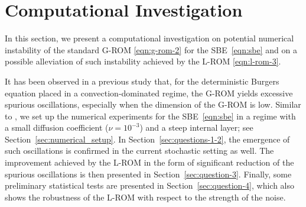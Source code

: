 \documentclass[11pt]{amsart}
\numberwithin{equation}{section}
\newcommand{\red}[1]{{\color{red}#1}}
\newcommand{\blue}[1]{{\color{blue}#1}}
\newcommand{\oa}{\overline{a}}
\newcommand{\bu}{\boldsymbol{u}}
\newcommand{\obu}{\overline{\boldsymbol u}}
\newcommand{\bx}{\boldsymbol{x}}
\newcommand{\bphi}{\boldsymbol{\varphi}}
\begin{document}


\section{Computational Investigation}
	\label{sec:computational-investigation}

In this section, we present a computational investigation on potential numerical instability of the standard G-ROM \eqref{eqn:g-rom-2} for the SBE~\eqref{eqn:sbe} and on a possible alleviation of such instability achieved by the L-ROM \eqref{eqn:l-rom-3}. 

It has been observed in a previous study \cite{wells2016regularized} that, for the deterministic Burgers equation placed in a convection-dominated regime, the G-ROM yields excessive spurious oscillations, especially when the dimension of the G-ROM is low. Similar to \cite{wells2016regularized}, we set up the numerical experiments for the SBE~\eqref{eqn:sbe} in a regime with a small diffusion coefficient ($\nu = 10^{-3}$) and a steep internal layer; see Section~\ref{sec:numerical_setup}. In Section~\ref{sec:questions-1-2}, the emergence of such oscillations is confirmed in the current stochastic setting as well. The improvement achieved by the L-ROM in the form of significant reduction of the spurious oscillations is then presented in Section~\ref{sec:question-3}. Finally, some preliminary statistical tests are presented in Section~\ref{sec:question-4}, which also shows the robustness of the L-ROM with respect to the strength of the noise.
\end{document}
